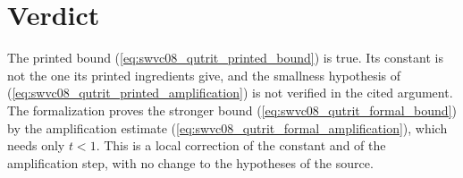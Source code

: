 \documentclass{article}
\begin{document}
\section{Verdict}

The printed bound (\ref{eq:swvc08_qutrit_printed_bound}) is true. Its
constant is not the one its printed ingredients give, and the smallness
hypothesis of (\ref{eq:swvc08_qutrit_printed_amplification}) is not verified
in the cited argument. The formalization proves the stronger bound
(\ref{eq:swvc08_qutrit_formal_bound}) by the amplification estimate
(\ref{eq:swvc08_qutrit_formal_amplification}), which needs only $t<1$. This is
a local correction of the constant and of the amplification step, with no
change to the hypotheses of the source.



\end{document}
